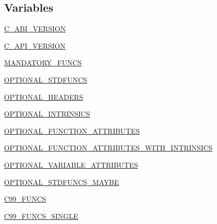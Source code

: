 \subsection*{Variables}
\begin{DoxyCompactItemize}
\item 
\hyperlink{namespacenumpy_1_1core_1_1setup__common_ae5c716c6b153782eca32d84603ca6716}{C\+\_\+\+A\+B\+I\+\_\+\+V\+E\+R\+S\+I\+ON}
\item 
\hyperlink{namespacenumpy_1_1core_1_1setup__common_ac14525f5f0de651f09687be390085fb1}{C\+\_\+\+A\+P\+I\+\_\+\+V\+E\+R\+S\+I\+ON}
\item 
\hyperlink{namespacenumpy_1_1core_1_1setup__common_a502ec1f29cd8678bede4487968401f05}{M\+A\+N\+D\+A\+T\+O\+R\+Y\+\_\+\+F\+U\+N\+CS}
\item 
\hyperlink{namespacenumpy_1_1core_1_1setup__common_a607a2ee0437e024f547c4ff83249d6fd}{O\+P\+T\+I\+O\+N\+A\+L\+\_\+\+S\+T\+D\+F\+U\+N\+CS}
\item 
\hyperlink{namespacenumpy_1_1core_1_1setup__common_a4b383f20f448af85a735846da7427308}{O\+P\+T\+I\+O\+N\+A\+L\+\_\+\+H\+E\+A\+D\+E\+RS}
\item 
\hyperlink{namespacenumpy_1_1core_1_1setup__common_ad59036fc8bc3bcb0d475bcb0e6869075}{O\+P\+T\+I\+O\+N\+A\+L\+\_\+\+I\+N\+T\+R\+I\+N\+S\+I\+CS}
\item 
\hyperlink{namespacenumpy_1_1core_1_1setup__common_a1f99f568bfda249ca55a9b2d550c721a}{O\+P\+T\+I\+O\+N\+A\+L\+\_\+\+F\+U\+N\+C\+T\+I\+O\+N\+\_\+\+A\+T\+T\+R\+I\+B\+U\+T\+ES}
\item 
\hyperlink{namespacenumpy_1_1core_1_1setup__common_ad938fd2fcadd4b3c1fd4d7a541fecd20}{O\+P\+T\+I\+O\+N\+A\+L\+\_\+\+F\+U\+N\+C\+T\+I\+O\+N\+\_\+\+A\+T\+T\+R\+I\+B\+U\+T\+E\+S\+\_\+\+W\+I\+T\+H\+\_\+\+I\+N\+T\+R\+I\+N\+S\+I\+CS}
\item 
\hyperlink{namespacenumpy_1_1core_1_1setup__common_a64d4fdc2701473bb836a224dbb8a30c5}{O\+P\+T\+I\+O\+N\+A\+L\+\_\+\+V\+A\+R\+I\+A\+B\+L\+E\+\_\+\+A\+T\+T\+R\+I\+B\+U\+T\+ES}
\item 
\hyperlink{namespacenumpy_1_1core_1_1setup__common_a4f26ca1f361eae61001f8e568005cc31}{O\+P\+T\+I\+O\+N\+A\+L\+\_\+\+S\+T\+D\+F\+U\+N\+C\+S\+\_\+\+M\+A\+Y\+BE}
\item 
\hyperlink{namespacenumpy_1_1core_1_1setup__common_a894ab1fc599d4132111df1d01a7578a2}{C99\+\_\+\+F\+U\+N\+CS}
\item 
\hyperlink{namespacenumpy_1_1core_1_1setup__common_ad174e73990ee6c034d1f9009c6c17127}{C99\+\_\+\+F\+U\+N\+C\+S\+\_\+\+S\+I\+N\+G\+LE}

\end{DoxyCompactItemize}
